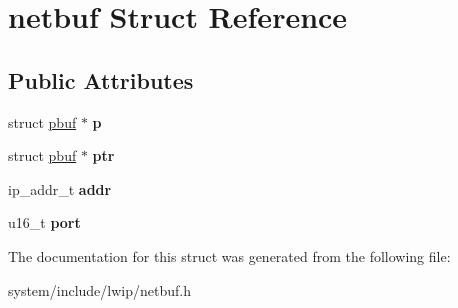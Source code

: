 \hypertarget{structnetbuf}{}\section{netbuf Struct Reference}
\label{structnetbuf}
\subsection*{Public Attributes}
\begin{DoxyCompactItemize}
\item 
\hypertarget{structnetbuf_ae0c3ba45f7e26a90585c8d79d59c41bd}{}struct \hyperlink{structpbuf}{pbuf} $\ast$ {\bfseries p}\label{structnetbuf_ae0c3ba45f7e26a90585c8d79d59c41bd}

\item 
\hypertarget{structnetbuf_a2301ad2b03edfb74049a2b0ef6cd2cd5}{}struct \hyperlink{structpbuf}{pbuf} $\ast$ {\bfseries ptr}\label{structnetbuf_a2301ad2b03edfb74049a2b0ef6cd2cd5}

\item 
\hypertarget{structnetbuf_a36d0b956d15d9eea205055e227143856}{}ip\+\_\+addr\+\_\+t {\bfseries addr}\label{structnetbuf_a36d0b956d15d9eea205055e227143856}

\item 
\hypertarget{structnetbuf_ac7a45470930d48463b039af4bf464fc4}{}u16\+\_\+t {\bfseries port}\label{structnetbuf_ac7a45470930d48463b039af4bf464fc4}

\end{DoxyCompactItemize}


The documentation for this struct was generated from the following file\+:\begin{DoxyCompactItemize}
\item 
system/include/lwip/netbuf.\+h\end{DoxyCompactItemize}
